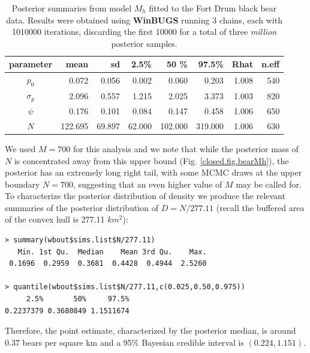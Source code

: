 \begin{table}[ht]
  \caption{
    Posterior summaries from model $M_h$ fitted to the Fort Drum black
    bear data. Results 
    were obtained using {\bf WinBUGS}
    running 3 chains, each with 1010000 iterations, discarding the
    first 10000 for a total of three {\it million} posterior samples. 
}
\begin{tabular}{crrrrrrr} \hline \hline
 parameter &  mean   &  sd    &   2.5\% &  50 \%  &   97.5\% &Rhat& n.eff  \\ \hline
$p_0$      &   0.072 & 0.056  &   0.002 &  0.060  &   0.203  &1.008 &
540  \\ 
$\sigma_p$ &    2.096&  0.557 &   1.215 &  2.025  &   3.373  &1.003 &
820 \\ 
$\psi$     &    0.176&  0.101 &   0.084 &  0.147  &   0.458  & 1.006&
650 \\ 
$N$        & 122.695 &69.897  &  62.000 & 102.000 & 319.000  &1.006 &
630 \\ \hline
\end{tabular}
\label{closed.tab.bear}
\end{table}




We used $M=700$ for this analysis and we
note that  while the posterior mass of $N$ is concentrated away from this
upper bound (Fig. \ref{closed.fig.bearMh}), the posterior has an
extremely long right tail, with some MCMC draws at the upper
boundary $N=700$, suggesting that an even higher value of $M$ may be
called for.
To characterize the posterior distribution of density we produce the
relevant summaries of the posterior distribution of $D  = N/277.11$
(recall
the buffered area of the convex hull is 277.11 $km^2$):
{\small
\begin{verbatim}
> summary(wbout$sims.list$N/277.11)
   Min. 1st Qu.  Median    Mean 3rd Qu.    Max.
 0.1696  0.2959  0.3681  0.4428  0.4944  2.5260

> quantile(wbout$sims.list$N/277.11,c(0.025,0.50,0.975))
     2.5%       50%     97.5%
0.2237379 0.3680849 1.1511674
\end{verbatim}
}
{\flushleft Therefore}, the point estimate, characterized by the posterior median, is around
$0.37$ bears per square km and a 95\% Bayesian credible interval is
$(0.224, 1.151)$.


